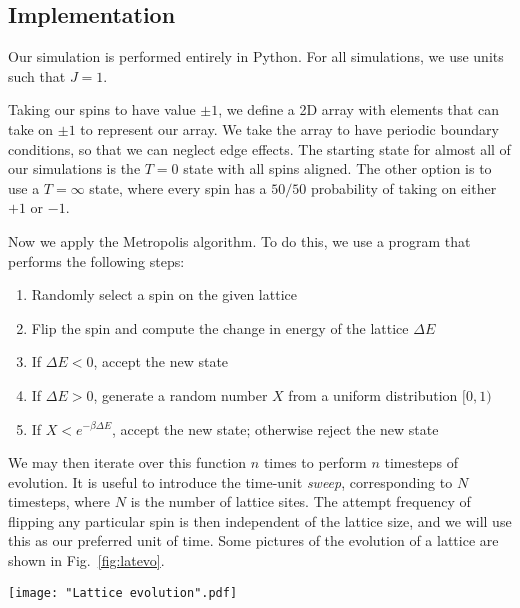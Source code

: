 \documentclass[twocolumn,aps]{revtex4-1} %
\begin{document}
\subsection{Implementation}
Our simulation is performed entirely in Python. For all simulations, we use units such that $J = 1$.

Taking our spins to have value $\pm 1$, we define a 2D array with elements that can take on $\pm 1$ to represent our array. We take the array to have periodic boundary conditions, so that we can neglect edge effects. The starting state for almost all of our simulations is the $T = 0$ state with all spins aligned. The other option is to use a $T = \infty$ state, where every spin has a $50/50$ probability of taking on either $+1$ or $-1$. 

Now we apply the Metropolis algorithm. To do this, we use a program that performs the following steps:
\begin{enumerate}
	\item Randomly select a spin on the given lattice
	\item Flip the spin and compute the change in energy of the lattice $\Delta E$
	\item If $\Delta E < 0$, accept the new state
	\item If $\Delta E > 0$, generate a random number $X$ from a uniform distribution $[0,1)$
	\item If $X < e^{-\beta \Delta E}$, accept the new state; otherwise reject the new state
\end{enumerate}
We may then iterate over this function $n$ times to perform $n$ timesteps of evolution. It is useful to introduce the time-unit \textit{sweep}, corresponding to $N$ timesteps, where $N$ is the number of lattice sites. The attempt frequency of flipping any particular spin is then independent of the lattice size, and we will use this as our preferred unit of time. Some pictures of the evolution of a lattice are shown in Fig.~\ref{fig:latevo}.
\begin{figure*}
	\texttt{[image: "Lattice evolution".pdf]}
	\caption{\label{fig:latevo}The evolution of a $100 \times 100$ square lattice at $T = 2.4$ via the Metropolis algorithm. The sequence is ordered from left to right, top to bottom. The two spin states $+1$ and $-1$ correspond to black and white, respectively. We have initialized the system in the $T = 0$ state, and plotted the system after 0, 1, 5, 10, 20, 50, 100, 500, and 1000 Monte Carlo sweeps.}
\end{figure*}
\end{document}
